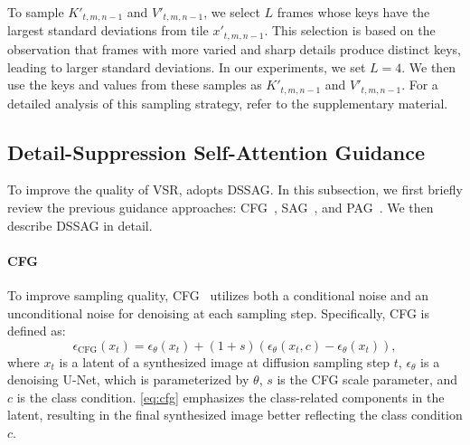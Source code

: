 To sample $K'_{t,m,n-1}$ and $V'_{t,m,n-1}$, we select $L$ frames whose keys have the largest standard deviations from tile $x'_{t,m,n-1}$. This selection is based on the observation that frames with more varied and sharp details produce distinct keys, leading to larger standard deviations. In our experiments, we set $L=4$. We then use the keys and values from these samples as $K'_{t,m,n-1}$ and $V'_{t,m,n-1}$. For a detailed analysis of this sampling strategy, refer to the supplementary material.

\subsection{Detail-Suppression Self-Attention Guidance}
\label{ssec:DSSAG}

To improve the quality of VSR, \ours{} adopts DSSAG.
In this subsection, we first briefly review the previous guidance approaches: CFG~\cite{cfg}, SAG~\cite{sag}, and PAG~\cite{pag}.
We then describe DSSAG in detail.

\paragraph{CFG}
To improve sampling quality, CFG~\cite{cfg} utilizes both a conditional noise and an unconditional noise for denoising at each sampling step. Specifically, CFG is defined as:
\begin{equation}
    \epsilon_\textrm{CFG}(x_t)=\epsilon_\theta(x_t)+(1+s)(\epsilon_\theta(x_t,c)-\epsilon_\theta(x_t)),
    \label{eq:cfg}
\end{equation}
where $x_t$ is a latent of a synthesized image at diffusion sampling step $t$, $\epsilon_\theta$ is a denoising U-Net, which is parameterized by $\theta$, $s$ is the CFG scale parameter, and $c$ is the class condition.
\cref{eq:cfg} emphasizes the class-related components in the latent, resulting in the final synthesized image better reflecting the class condition $c$.

